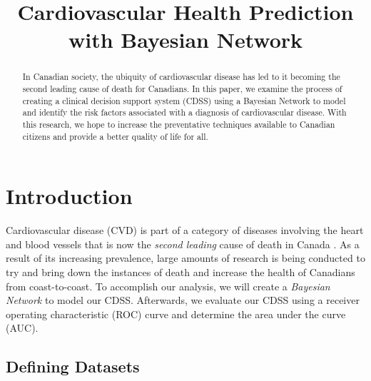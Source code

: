 \documentclass[conference]{IEEEtran}
\begin{document}
\title{Cardiovascular Health Prediction with Bayesian Network}


\author{
}

\maketitle

\begin{abstract}
In Canadian society, the ubiquity of cardiovascular disease has led to it becoming the second leading cause of death for Canadians. In this paper, we examine the process of creating a clinical decision support system (CDSS) using a Bayesian Network to model and identify the risk factors associated with a diagnosis of cardiovascular disease. With this research, we hope to increase the preventative techniques available to Canadian citizens and provide a better quality of life for all.
\end{abstract}

\IEEEpeerreviewmaketitle

\section{Introduction}
Cardiovascular disease (CVD) is part of a category of diseases involving the heart and blood vessels that is now the \textit{second leading} cause of death in Canada \cite{StatsCan}. As a result of its increasing prevalence, large amounts of research is being conducted to try and bring down the instances of death and increase the health of Canadians from coast-to-coast. To accomplish our analysis, we will create a \textit{Bayesian Network} to model our CDSS. Afterwards, we evaluate our CDSS using a receiver operating characteristic (ROC) curve and determine the area under the curve (AUC).  
\subsection{Defining Datasets}
\end{document}
